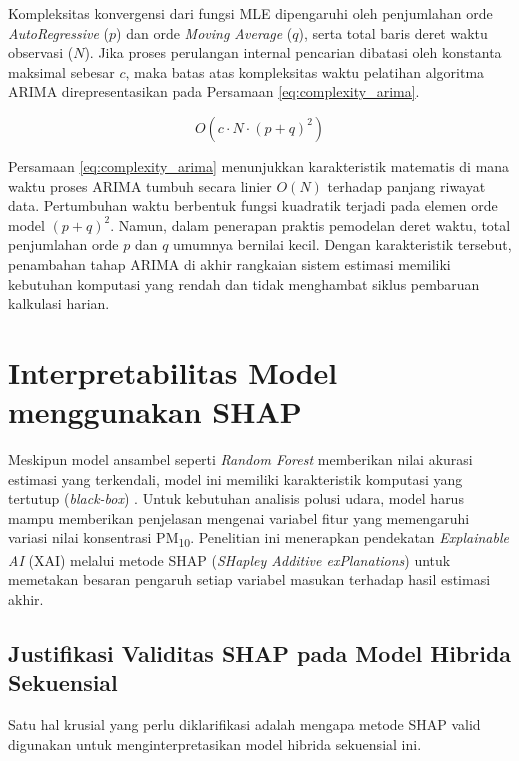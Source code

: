 Kompleksitas konvergensi dari fungsi MLE dipengaruhi oleh penjumlahan orde \textit{AutoRegressive} ($p$) dan orde \textit{Moving Average} ($q$), serta total baris deret waktu observasi ($N$). Jika proses perulangan internal pencarian dibatasi oleh konstanta maksimal sebesar $c$, maka batas atas kompleksitas waktu pelatihan algoritma ARIMA direpresentasikan pada Persamaan \ref{eq:complexity_arima}.

\begin{equation}
    O(c \cdot N \cdot (p+q)^2)
\label{eq:complexity_arima}
\end{equation}

Persamaan \ref{eq:complexity_arima} menunjukkan karakteristik matematis di mana waktu proses ARIMA tumbuh secara linier $O(N)$ terhadap panjang riwayat data. Pertumbuhan waktu berbentuk fungsi kuadratik terjadi pada elemen orde model $(p+q)^2$. Namun, dalam penerapan praktis pemodelan deret waktu, total penjumlahan orde $p$ dan $q$ umumnya bernilai kecil. Dengan karakteristik tersebut, penambahan tahap ARIMA di akhir rangkaian sistem estimasi memiliki kebutuhan komputasi yang rendah dan tidak menghambat siklus pembaruan kalkulasi harian.

\section{Interpretabilitas Model menggunakan SHAP}

Meskipun model ansambel seperti \textit{Random Forest} memberikan nilai akurasi estimasi yang terkendali, model ini memiliki karakteristik komputasi yang tertutup (\textit{black-box}) \autocite{jimenez2024explainable}. Untuk kebutuhan analisis polusi udara, model harus mampu memberikan penjelasan mengenai variabel fitur yang memengaruhi variasi nilai konsentrasi PM\textsubscript{10}. Penelitian ini menerapkan pendekatan \textit{Explainable AI} (XAI) melalui metode SHAP (\textit{SHapley Additive exPlanations}) untuk memetakan besaran pengaruh setiap variabel masukan terhadap hasil estimasi akhir.

\subsection{Justifikasi Validitas SHAP pada Model Hibrida Sekuensial}
Satu hal krusial yang perlu diklarifikasi adalah mengapa metode SHAP valid digunakan untuk menginterpretasikan model hibrida sekuensial ini. 

